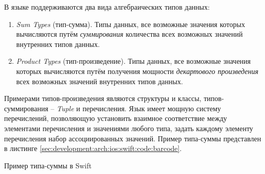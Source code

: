В языке поддерживаются два вида алгебраических типов данных:

\begin{enumerate}
	\item \emph{Sum Types} (тип-сумма). Типы данных, все возможные значения которых вычисляются путём \textit{суммирования} количества всех возможных значений внутренних типов данных.
	\item \emph{Product Types} (тип-произведение). Типы данных, все возможные значения которых вычисляются путём получения мощности \textit{декартового произведения} всех возможных значений внутренних типов данных.
\end{enumerate}

Примерами типов-произведения являются структуры и классы, типов-суммирования -- \textit{Tuple} и перечисления. Язык имеет мощную систему перечислений, позволяющую установить взаимное соответствие между элементами перечисления и значениями любого типа, задать каждому элементу перечисления набор ассоциированных значений. Пример типа-суммы представлен в листинге \ref{sec:development:arch:ios:swift:code:barcode}.

\begin{code}
	
   \caption{Пример типа-суммы в Swift}
   \label{sec:development:arch:ios:swift:code:barcode}
\end{code}